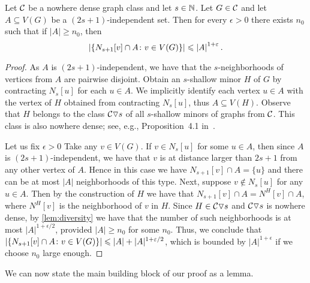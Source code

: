 \begin{corollary}\label{lem:gajarsky}
Let $\mathcal{C}$ be a nowhere dense graph class and let $s\in \mathbb{N}$. 
Let $G\in \mathcal{C}$ and let $A\subseteq V(G)$ be a $(2s+1)$-independent
set.
Then for every $\epsilon>0$ there exists $n_0$ such that if $|A|\geq n_0$, then 
\[\left\lvert\{N_{s+1}[v]\cap A \colon v\in V(G)\}\right\rvert\leqslant\left\lvert A\right\rvert^{1+\varepsilon}.\]
\end{corollary}
\begin{proof}
As $A$ is $(2s+1)$-independent, we have that the $s$-neighborhoods of vertices from $A$ are pairwise disjoint.
Obtain an $s$-shallow minor $H$ of $G$ by contracting $N_s[u]$ for each $u\in A$. 
We implicitly identify each vertex $u\in A$ with the vertex of $H$ obtained from contracting $N_s[u]$, thus $A\subseteq V(H)$.
Observe that $H$ belongs to the class $\mathcal{C}\triangledown s$ of all $s$-shallow minors of graphs from $\mathcal{C}$. This class is also nowhere dense;
see, e.g., Proposition~4.1 in~\cite{sparsity}.

Let us fix $\epsilon>0$
Take any $v\in V(G)$. If $v\in N_s[u]$ for some $u\in A$, then since $A$ is $(2s+1)$-independent, we have that $v$ is at distance larger than $2s+1$ from any other vertex of $A$.
Hence in this case we have $N_{s+1}[v]\cap A=\{u\}$ and there can be at most $|A|$ neighborhoods of this type.
Next, suppose $v\notin N_s[u]$ for any $u\in A$. Then by the construction of $H$ we have that $N_{s+1}[v]\cap A=N^H[v]\cap A$, where $N^H[v]$ is the neighborhood of $v$ in $H$.
Since $H\in \mathcal{C}\triangledown s$ and $\mathcal{C}\triangledown s$ is nowhere dense, by \cref{lem:diversity} we have that the number of such neighborhoods is at most $|A|^{1+\epsilon/2}$,
provided $|A|\geq n_0$ for some $n_0$.
Thus, we conclude that $\left\lvert\{N_{s+1}[v]\cap A \colon v\in V(G)\}\right\rvert\leqslant |A|+|A|^{1+\varepsilon/2}$, which is bounded by $|A|^{1+\epsilon}$ if we choose $n_0$ large enough.
\end{proof}





We can now state the main building block of our proof as a lemma. 

